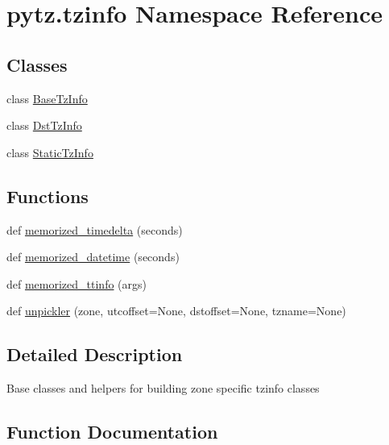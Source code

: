 \hypertarget{namespacepytz_1_1tzinfo}{}\section{pytz.\+tzinfo Namespace Reference}
\label{namespacepytz_1_1tzinfo}
\subsection*{Classes}
\begin{DoxyCompactItemize}
\item 
class \hyperlink{classpytz_1_1tzinfo_1_1BaseTzInfo}{Base\+Tz\+Info}
\item 
class \hyperlink{classpytz_1_1tzinfo_1_1DstTzInfo}{Dst\+Tz\+Info}
\item 
class \hyperlink{classpytz_1_1tzinfo_1_1StaticTzInfo}{Static\+Tz\+Info}
\end{DoxyCompactItemize}
\subsection*{Functions}
\begin{DoxyCompactItemize}
\item 
def \hyperlink{namespacepytz_1_1tzinfo_aa88228d1ac2d80c09eff7d1eb0dab7b1}{memorized\+\_\+timedelta} (seconds)
\item 
def \hyperlink{namespacepytz_1_1tzinfo_a5e88e1294125e1acac0b11502e949d0e}{memorized\+\_\+datetime} (seconds)
\item 
def \hyperlink{namespacepytz_1_1tzinfo_a162a0f44b21d1c0ab80ca7b6f319dc83}{memorized\+\_\+ttinfo} (args)
\item 
def \hyperlink{namespacepytz_1_1tzinfo_abfa314b5b1f93e87637b0a7378bf078d}{unpickler} (zone, utcoffset=None, dstoffset=None, tzname=None)
\end{DoxyCompactItemize}


\subsection{Detailed Description}
\begin{DoxyVerb}Base classes and helpers for building zone specific tzinfo classes\end{DoxyVerb}
 

\subsection{Function Documentation}
\mbox{\label{namespacepytz_1_1tzinfo_a5e88e1294125e1acac0b11502e949d0e}} 
